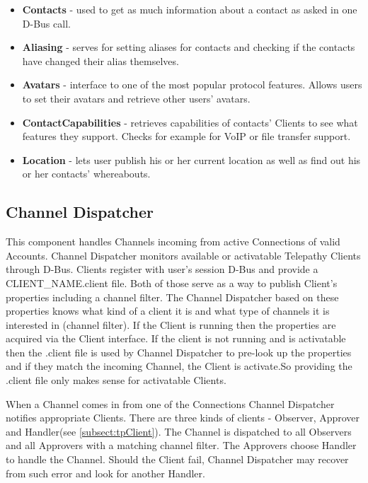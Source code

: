\begin{itemize}

	\item {\bf Contacts} - used to get as much information about a contact as asked in one D-Bus call.

	\item {\bf Aliasing} - serves for setting aliases for contacts and checking if the contacts have changed their alias themselves. 

	\item {\bf Avatars} - interface to one of the most popular protocol features. Allows users to set their avatars and retrieve other users' avatars.

	\item {\bf ContactCapabilities} - retrieves capabilities of contacts' Clients to see what features they support. Checks for example for VoIP or file transfer support.

	\item {\bf Location} - lets user publish his or her current location as well as find out his or her contacts' whereabouts. 

\end{itemize}


\subsection*{Channel Dispatcher}
This component handles Channels incoming from active Connections of valid Accounts. Channel Dispatcher monitors available or activatable Telepathy Clients through D-Bus. Clients register with user's session D-Bus and provide a CLIENT\_NAME.client file. Both of those serve as a way to publish Client's properties including a channel filter. The Channel Dispatcher based on these properties knows what kind of a client it is and what type of channels it is interested in (channel filter). If the Client is running then the properties are acquired via the Client interface. If the client is not running and is activatable then the .client file is used by Channel Dispatcher to pre-look up the properties and if they match the incoming Channel, the Client is activate.So providing the .client file only makes sense for activatable Clients.  

When a Channel comes in from one of the Connections Channel Dispatcher notifies appropriate Clients. There are three kinds of clients - Observer, Approver and Handler(see \ref{subsect:tpClient}). The Channel is dispatched to all Observers and all Approvers with a matching channel filter. The Approvers choose Handler to handle the Channel. Should the Client fail, Channel Dispatcher may recover from such error and look for another Handler.\cite{TPWiki}  


